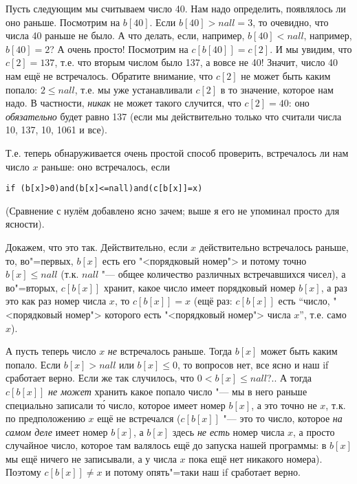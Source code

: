 Пусть следующим мы считываем число 40. Нам надо определить, появлялось ли оно раньше. Посмотрим  
на $b[40]$. Если $b[40]>nall=3$, то очевидно, что числа 40 раньше не было. А что делать, если, 
например, $b[40]<nall$, например, $b[40]=2$? А очень просто! Посмотрим на $c[b[40]]=c[2]$. И мы 
увидим, что $c[2]=137$, т.е. что вторым числом было 137, а вовсе не 40! Значит, число 40 нам ещё не 
встречалось. Обратите внимание, что $c[2]$ не может быть каким попало: $2\leq nall$, т.е. мы уже 
устанавливали $c[2]$ в то значение, которое нам надо. В частности, \textit{никак} не может такого 
случится, что $c[2]=40$: оно \textit{обязательно} будет равно 137 (если мы действительно только что 
считали числа 10, 137, 10, 1061 и все).

Т.е. теперь обнаруживается очень простой способ проверить, встречалось ли нам число $x$ раньше: 
оно встречалось, если
\begin{codesampleo}\begin{verbatim}
if (b[x]>0)and(b[x]<=nall)and(c[b[x]]=x)
\end{verbatim}\end{codesampleo}

(Сравнение с нулём добавлено ясно зачем; выше я его не упоминал просто для ясности).

Докажем, что это так. Действительно, если $x$ действительно встречалось раньше, то, во"=первых, 
$b[x]$ есть его "<порядковый номер"> и потому точно $b[x]\leq nall$ (т.к. $nall$ "--- 
общее количество различных встречавшихся чисел), а во"=вторых, $c[b[x]]$ хранит, какое число имеет 
порядковый номер $b[x]$, а раз это как раз номер числа $x$, то $c[b[x]]=x$ (ещё раз: $c[b[x]]$ есть 
``число, "<порядковый номер"> которого есть "<порядковый номер"> числа $x$'', т.е. само $x$). 

А пусть теперь число $x$ \textit{не} встречалось раньше. Тогда $b[x]$ может быть каким попало. Если 
$b[x]>nall$ или $b[x]\leq 0$, то вопросов нет, все ясно и наш if сработает верно. Если же так случилось, что 
$0<b[x]\leq nall$?.. А тогда $c[b[x]]$ \textit{не может} хранить какое попало число "--- мы в него 
раньше специально записали т\'{о} число, которое имеет номер $b[x]$, а это точно не $x$, т.к. по 
предположению $x$ ещё не встречался ($c[b[x]]$ "--- это то число, которое \textit{на самом деле} 
имеет номер $b[x]$, а $b[x]$ здесь \textit{не есть} номер числа $x$, а просто случайное число, 
которое там валялось ещё до запуска нашей программы: в $b[x]$ мы ещё ничего не записывали, а у 
числа $x$ пока ещё нет никакого номера). Поэтому  
$c[b[x]]\neq x$ и потому опять"=таки наш if сработает верно.

